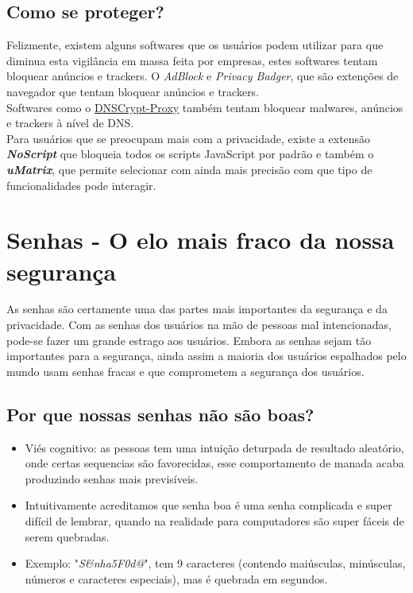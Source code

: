 \documentclass[12pt, letterpaper]{report}
\begin{document}
\subsection{Como se proteger?}
	Felizmente, existem alguns softwares que os usuários podem utilizar para que diminua esta vigilância em massa feita por empresas, estes softwares tentam bloquear anúncios e trackers. O \textit{AdBlock} e \textit{Privacy Badger}, que são extenções de navegador que tentam bloquear anúncios e trackers.\\

	Softwares como o \href{https://linuxroot1.github.io/DNSCRYPT-Proxy/}{DNSCrypt-Proxy} também tentam bloquear malwares, anúncios e trackers à nível de DNS.\\

	Para usuários que se preocupam mais com a privacidade, existe a extensão \textbf{\textit{NoScript}} que bloqueia todos os scripts JavaScript por padrão e também o \textbf{\textit{uMatrix}}, que permite selecionar com ainda mais precisão com que tipo de funcionalidades pode interagir.



\section*{Senhas - O elo mais fraco da nossa segurança}

As senhas são certamente uma das partes mais importantes da segurança e da privacidade. Com as senhas dos usuários na mão de pessoas mal intencionadas, pode-se fazer um grande estrago aos usuários. Embora as senhas sejam tão importantes para a segurança, ainda assim a maioria dos usuários espalhados pelo mundo usam senhas fracas e que comprometem a segurança dos usuários.\\

\subsection{Por que nossas senhas não são boas?}

\begin{itemize}
	\item Viés cognitivo: as pessoas tem uma intuição deturpada de resultado aleatório, onde certas sequencias são favorecidas, esse comportamento de manada acaba produzindo senhas mais previsíveis.
	\item Intuitivamente acreditamos que senha boa é uma senha complicada e super difícil de lembrar, quando na realidade para computadores são super fáceis de serem quebradas.
	\item Exemplo: "\textit{S\&nha5F0d@}", tem 9 caracteres (contendo maiúsculas, minúsculas, números e caracteres especiais), mas é quebrada em segundos.
\end{itemize}
\end{document}

